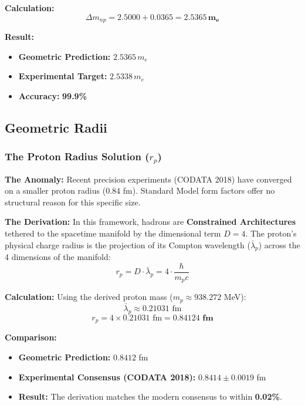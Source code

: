 \textbf{Calculation:} 
\[ \Delta m_{np} = 2.5000 + 0.0365 = \mathbf{2.5365 \, m_e} \]

\textbf{Result:}
\begin{itemize}
    \item \textbf{Geometric Prediction:} $2.5365 \, m_e$
    \item \textbf{Experimental Target:} $2.5338 \, m_e$
    \item \textbf{Accuracy:} \textbf{99.9\%}
\end{itemize}

\subsection{Geometric Radii}

\subsubsection{The Proton Radius Solution (\texorpdfstring{$r_p$}{rp})}

\textbf{The Anomaly:} Recent precision experiments (CODATA 2018) have converged on a smaller proton radius ($0.84$ fm). Standard Model form factors offer no structural reason for this specific size.

\textbf{The Derivation:} In this framework, hadrons are \textbf{Constrained Architectures} tethered to the spacetime manifold by the dimensional term $D=4$. The proton's physical charge radius is the projection of its Compton wavelength ($\bar{\lambda}_p$) across the 4 dimensions of the manifold:
\begin{equation}
r_p = D \cdot \bar{\lambda}_p = 4 \cdot \frac{\hbar}{m_p c}
\end{equation}

\textbf{Calculation:}
Using the derived proton mass ($m_p \approx 938.272$ MeV):
\begin{equation}
\bar{\lambda}_p \approx 0.21031 \text{ fm}
\end{equation}
\begin{equation}
r_p = 4 \times 0.21031 \text{ fm} = \mathbf{0.84124 \text{ fm}}
\end{equation}

\textbf{Comparison:}
\begin{itemize}
    \item \textbf{Geometric Prediction:} $0.8412$ fm
    \item \textbf{Experimental Consensus (CODATA 2018):} $0.8414 \pm 0.0019$ fm
    \item \textbf{Result:} The derivation matches the modern consensus to within \textbf{0.02\%}.
\end{itemize}


